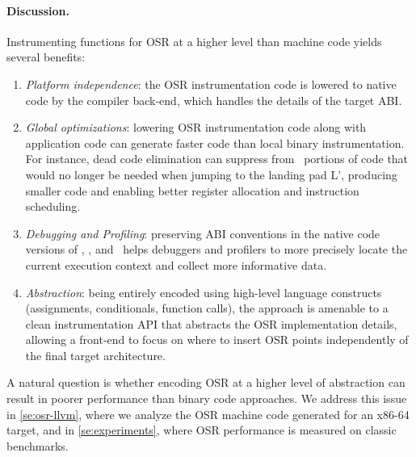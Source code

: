 \paragraph{Discussion.}
Instrumenting functions for OSR at a higher level than machine code yields several benefits: 
\begin{enumerate}
\item {\em Platform independence}: the OSR instrumentation code is lowered to native code by the compiler back-end, which handles the details of the target ABI. 
\item {\em Global optimizations}: lowering OSR instrumentation code along with application code can generate faster code than local binary instrumentation. For instance, dead code elimination can suppress from \fosrto\ portions of code that would no longer be needed when jumping to the landing pad \textsf{L'}, producing smaller code and enabling better register allocation and instruction scheduling.
\item {\em Debugging and Profiling}: preserving ABI conventions in the native code versions of \fosrfrom, \fstub, and \fosrto\ helps debuggers and profilers to more precisely locate the current execution context and collect more informative data.
\item {\em Abstraction}: being entirely encoded using high-level language constructs (assignments, conditionals, function calls), the approach is amenable to a clean instrumentation API that abstracts the OSR implementation details, allowing a front-end to focus on where to insert OSR points independently of the final target architecture.
\end{enumerate}

\noindent A natural question is whether encoding OSR at a higher level of abstraction can result in poorer performance than binary code approaches. We address this issue in \mysection\ref{se:osr-llvm}, where we analyze the OSR machine code generated for an x86-64 target, and in \mysection\ref{se:experiments}, where OSR performance is measured on classic benchmarks.
